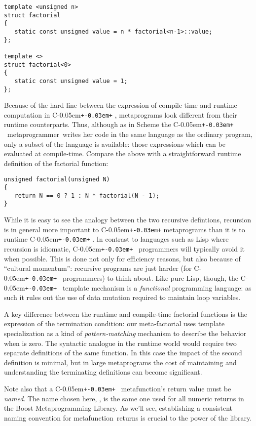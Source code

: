 \documentclass{netobjectdays}
\newcommand{\Cpp}{C\kern-0.05em\texttt{+\kern-0.03em+}%
}
\newcommand{\Mpl}{Boost Meta\-program\-ming Library}
\newcommand{\mpgmer}{meta\-program\-mer}
\newcommand{\mfn}{meta\-function}
\begin{document}
{\footnotesize
\begin{verbatim}
template <unsigned n>
struct factorial
{
   static const unsigned value = n * factorial<n-1>::value;
};

template <>
struct factorial<0>
{
   static const unsigned value = 1;
};
\end{verbatim}
}

Because of the hard line between the expression of compile-time and
runtime computation in \Cpp, metaprograms look different from their
runtime counterparts. Thus, although as in Scheme the \Cpp\ \mpgmer\
writes her code in the same language as the ordinary program, only a
subset of the language is available: those expressions which
can be evaluated at compile-time. Compare the above with a
straightforward runtime definition of the factorial function:

{\footnotesize
\begin{verbatim}
unsigned factorial(unsigned N)
{
   return N == 0 ? 1 : N * factorial(N - 1);
}
\end{verbatim}
}

While it is easy to see the analogy between the two recursive
defintions, recursion is in general more important to \Cpp{}
metaprograms than it is to runtime \Cpp. In contrast to languages such
as Lisp where recursion is idiomatic, \Cpp\ programmers will typically
avoid it when possible. This is done not only for efficiency
reasons, but also because of ``cultural momentum'': recursive programs
are just harder (for \Cpp\ programmers) to think about. Like pure Lisp,
though, the \Cpp\ template mechanism is a \emph{functional} programming
language: as such it rules out the use of data mutation required to
maintain loop variables.

A key difference between the runtime and compile-time factorial
functions is the expression of the termination condition: our
meta-factorial uses template specialization as a kind of
\emph{pattern-matching} mechanism to describe the behavior when
 is zero. The syntactic analogue in the runtime world would
require two separate definitions of the same function. In this case
the impact of the second definition is minimal, but in large
metaprograms the cost of maintaining and understanding the terminating
definitions can become significant.

Note also that a \Cpp\ \mfn's return value must be \emph{named}. The
name chosen here, \code{value}, is the same one used for all numeric
returns in the \Mpl. As we'll see, establishing a consistent naming
convention for \mfn\ returns is crucial to the power of the library.
\end{document}
